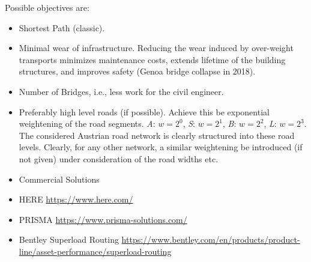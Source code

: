 Possible objectives are:
\begin{itemize}
  \item Shortest Path (classic).

  \item Minimal wear of infrastructure. Reducing the wear induced by over-weight transports
  minimizes maintenance costs, extends lifetime of the building structures, and
  improves safety (Genoa bridge collapse in 2018).
  \citet{Kakan2014}


  \item Number of Bridges, i.e., less work for the civil engineer.
  \item Preferably high level roads (if possible).
  Achieve this be exponential weightening of the road segments.
  \textit{A}: $w=2^0$,    \textit{S}: $w=2^1$,      \textit{B}: $w=2^2$,     \textit{L}: $w=2^3$.
  The considered Austrian road network is clearly structured into these road levels.
  Clearly, for any other network, a similar weightening be introduced
  (if not given) under consideration of the road widths etc.
\end{itemize}

\begin{itemize}





  \item Commercial Solutions

  \item HERE
  \url{https://www.here.com/}
  \item PRISMA
  \url{https://www.prisma-solutions.com/}

  \item Bentley Superload Routing
  \url{https://www.bentley.com/en/products/product-line/asset-performance/superload-routing}

\end{itemize}
